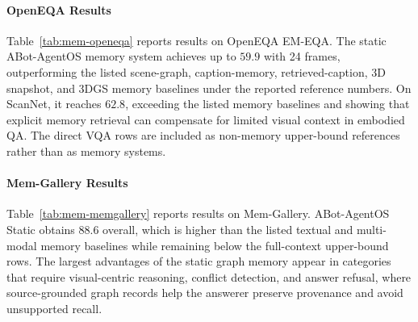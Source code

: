 \paragraph{OpenEQA Results}
Table~\ref{tab:mem-openeqa} reports results on OpenEQA EM-EQA.
The static ABot-AgentOS memory system achieves up to $59.9$ with 24 frames, outperforming the listed scene-graph, caption-memory, retrieved-caption, 3D snapshot, and 3DGS memory baselines under the reported reference numbers.
On ScanNet, it reaches $62.8$, exceeding the listed memory baselines and showing that explicit memory retrieval can compensate for limited visual context in embodied QA.
The direct VQA rows are included as non-memory upper-bound references rather than as memory systems.


\paragraph{Mem-Gallery Results}
Table~\ref{tab:mem-memgallery} reports results on Mem-Gallery.
ABot-AgentOS Static obtains $88.6$ overall, which is higher than the listed textual and multi-modal memory baselines while remaining below the full-context upper-bound rows.
The largest advantages of the static graph memory appear in categories that require visual-centric reasoning, conflict detection, and answer refusal, where source-grounded graph records help the answerer preserve provenance and avoid unsupported recall.

